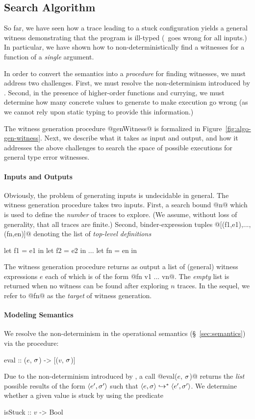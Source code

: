 \subsection{Search Algorithm}
\label{sec:search-algorithm}
%
So far, we have seen how a trace leading to a stuck configuration yields
a general witness demonstrating that the program is ill-typed (\ie\ goes
wrong for all inputs.)
In particular, we have shown how to non-deterministically find a witnesses
for a function of a \emph{single} argument.

In order to convert the semantics into a \emph{procedure} for finding
witnesses, we must address two challenges.
%
First, we must resolve the non-determinism introduced by \gensym.
%
Second, in the presence of higher-order functions and currying,
we must determine how many concrete values to generate to make
execution go wrong (as we cannot rely upon static typing to
provide this information.)

The witness generation procedure @genWitness@ is formalized in
Figure~\ref{fig:algo-gen-witness}.
%
Next, we describe what it takes as input and output, and how it
addresses the above challenges to search the space of possible
executions for general type error witnesses.

\paragraph{Inputs and Outputs}
%
Obviously, the problem of generating inputs is undecidable in general.
%
The witness generation procedure takes two inputs.
%
First, a search bound @n@ which is used to define the \emph{number} of
traces to explore. (We assume, without loss of generality, that all
traces are finite.)
%
Second, binder-expression tuples @[(f1,e1),...,(fn,en)]@
denoting the list of \emph{top-level definitions}
%
\begin{code}
  let f1 = e1 in
  let f2 = e2 in
  ...
  let fn = en in
\end{code}
%
The witness generation procedure returns as output a list of (general)
witness expressions $e$ each of which is of the form @fn v1 ... vn@.
%
The \emph{empty} list is returned when no witness can be found after
exploring $n$ traces.
%
In the sequel, we refer to @fn@ as the \emph{target} of witness generation.

\paragraph{Modeling Semantics}
%
We resolve the non-determinism in the operational semantics
(\S~\ref{sec:semantics}) via the procedure:
%
\begin{mcode}
  eval :: ($e$, $\sigma$) -> [($v$, $\sigma$)]
\end{mcode}
%
Due to the non-determinism introduced by \gensym, a call @eval($e$, $\sigma$)@
returns the \emph{list} possible results of the form $\langle e', \sigma' \rangle$ such
that $\langle e, \sigma \rangle \hookrightarrow^{*} \langle e', \sigma' \rangle$.
%
We determine whether a given value is stuck by using the predicate
%
\begin{mcode}
  isStuck :: $v$ -> Bool
\end{mcode}

